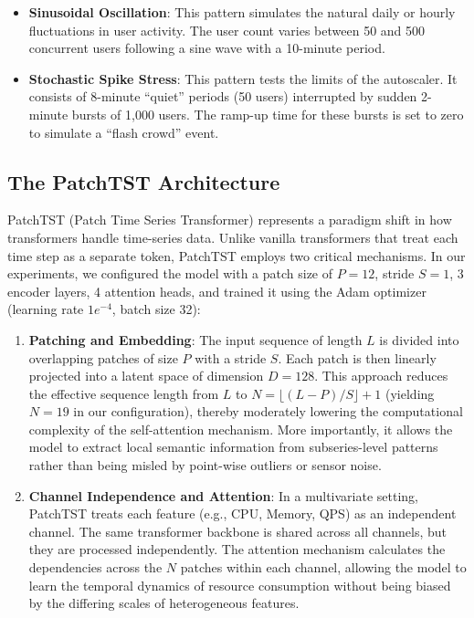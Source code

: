 \documentclass[conference]{IEEEtran}
\begin{document}
\begin{itemize}
    \item \textbf{Sinusoidal Oscillation}: This pattern simulates the natural daily or hourly fluctuations in user activity. The user count varies between 50 and 500 concurrent users following a sine wave with a 10-minute period.
    \item \textbf{Stochastic Spike Stress}: This pattern tests the limits of the autoscaler. It consists of 8-minute ``quiet'' periods (50 users) interrupted by sudden 2-minute bursts of 1,000 users. The ramp-up time for these bursts is set to zero to simulate a ``flash crowd'' event.
\end{itemize}

\subsection{The PatchTST Architecture}
PatchTST (Patch Time Series Transformer) represents a paradigm shift in how transformers handle time-series data. Unlike vanilla transformers that treat each time step as a separate token, PatchTST employs two critical mechanisms. In our experiments, we configured the model with a patch size of $P=12$, stride $S=1$, 3 encoder layers, 4 attention heads, and trained it using the Adam optimizer (learning rate $1e^{-4}$, batch size 32):

\begin{enumerate}
    \item \textbf{Patching and Embedding}: The input sequence of length $L$ is divided into overlapping patches of size $P$ with a stride $S$. Each patch is then linearly projected into a latent space of dimension $D=128$. This approach reduces the effective sequence length from $L$ to $N = \lfloor(L - P)/S\rfloor + 1$ (yielding $N=19$ in our configuration), thereby moderately lowering the computational complexity of the self-attention mechanism. More importantly, it allows the model to extract local semantic information from subseries-level patterns rather than being misled by point-wise outliers or sensor noise.
    \item \textbf{Channel Independence and Attention}: In a multivariate setting, PatchTST treats each feature (e.g., CPU, Memory, QPS) as an independent channel. The same transformer backbone is shared across all channels, but they are processed independently. The attention mechanism calculates the dependencies across the $N$ patches within each channel, allowing the model to learn the temporal dynamics of resource consumption without being biased by the differing scales of heterogeneous features.
\end{enumerate}
\end{document}
